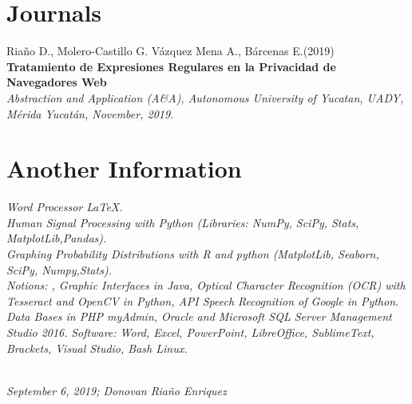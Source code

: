 \documentclass[]{friggeri-cv}
\begin{document}
\section{Journals}

Riaño D., Molero-Castillo G. Vázquez Mena A., Bárcenas E.(2019)\\
\textbf{Tratamiento de Expresiones Regulares en la Privacidad de Navegadores Web}\\
\emph{Abstraction and Application (A\&A), Autonomous University of Yucatan, UADY, Mérida Yucatán, November, 2019.}
\\
\section{Another Information}

\emph{Word Processor \LaTeX. \\ }
\emph{Human Signal Processing with Python (Libraries: NumPy, SciPy, Stats, MatplotLib,Pandas).\\}
\emph{Graphing Probability Distributions with R and python (MatplotLib, Seaborn, SciPy, Numpy,Stats).\\}
\emph{Notions: , Graphic Interfaces in Java, Optical Character Recognition (OCR) with Tesseract and OpenCV in Python, API Speech Recognition of Google in Python. \\}
\emph{Data Bases in PHP myAdmin, Oracle and Microsoft SQL Server Management Studio 2016.}
\emph{Software: Word, Excel, PowerPoint, LibreOffice, SublimeText, Brackets, Visual Studio, Bash Linux.\\ }
\\
\begin{flushleft}
\emph{September 6, 2019; Donovan Riaño Enriquez}
\end{flushleft}


\clearpage

 
 
 

 


% 
\end{document}
